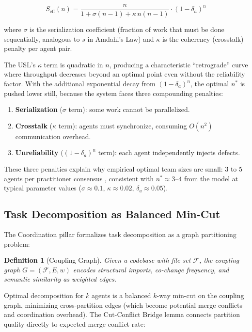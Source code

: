 \documentclass[11pt, a4paper, logo, copyright]{googledeepmind}
\newtheorem{definition}{Definition}[section]
\begin{document}
\begin{equation}
\label{eq:usl-extended}
    S_{\mathrm{eff}}(n) = \frac{n}{1 + \sigma(n-1) + \kappa \, n(n-1)} \cdot (1-\delta_a)^n
\end{equation}

where $\sigma$ is the serialization coefficient (fraction of work that must be done sequentially, analogous to $s$ in Amdahl's Law) and $\kappa$ is the coherency (crosstalk) penalty per agent pair.

The USL's $\kappa$ term is quadratic in $n$, producing a characteristic ``retrograde'' curve where throughput decreases beyond an optimal point even without the reliability factor. With the additional exponential decay from $(1-\delta_a)^n$, the optimal $n^*$ is pushed lower still, because the system faces three compounding penalties:

\begin{enumerate}[nosep]
    \item \textbf{Serialization} ($\sigma$ term): some work cannot be parallelized.
    \item \textbf{Crosstalk} ($\kappa$ term): agents must synchronize, consuming $O(n^2)$ communication overhead.
    \item \textbf{Unreliability} ($(1-\delta_a)^n$ term): each agent independently injects defects.
\end{enumerate}

These three penalties explain why empirical optimal team sizes are small: 3 to 5 agents per practitioner consensus \citep{osmani2025}, consistent with $n^* \approx 3$--$4$ from the model at typical parameter values ($\sigma \approx 0.1$, $\kappa \approx 0.02$, $\delta_a \approx 0.05$).

\subsection{Task Decomposition as Balanced Min-Cut}

The Coordination pillar formalizes task decomposition as a graph partitioning problem:

\begin{definition}[Coupling Graph]
Given a codebase with file set $\mathcal{F}$, the coupling graph $G = (\mathcal{F}, E, w)$ encodes structural imports, co-change frequency, and semantic similarity as weighted edges.
\end{definition}

Optimal decomposition for $k$ agents is a balanced $k$-way min-cut on the coupling graph, minimizing cross-partition edges (which become potential merge conflicts and coordination overhead). The Cut-Conflict Bridge lemma connects partition quality directly to expected merge conflict rate:
\end{document}

